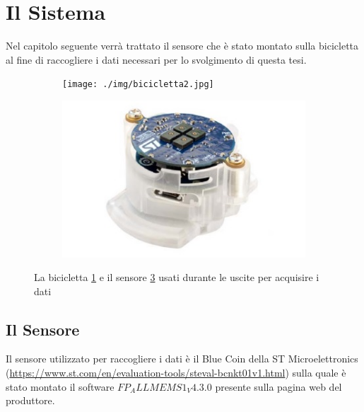 \documentclass[class=article]{standalone}
\begin{document}
	\section{Il Sistema}
	Nel capitolo seguente verrà trattato il sensore che è stato montato sulla bicicletta al fine di raccogliere i dati necessari per lo svolgimento di questa tesi. 
	
	\begin{figure}[h]
		\begin{subfigure}[h]{0.5\textwidth}
			\centering\texttt{[image: ./img/bicicletta2.jpg]}
			\caption{}
			\label{fig:bici}
		\end{subfigure}
		\begin{subfigure}[h]{0.5\textwidth}
			\centering\includegraphics[width=0.8\linewidth]{./img/bluecoin.jpg}
			\caption{}
			\label{fig:sensore}
		\end{subfigure}
		
		\caption[]{La bicicletta \ref{fig:bici} e il sensore \ref{fig:sensore} usati durante le uscite per acquisire i dati}
	\end{figure}
	
	\subsection{Il Sensore}
	Il sensore utilizzato per raccogliere i dati è il Blue Coin della ST Microelettronics (\url{https://www.st.com/en/evaluation-tools/steval-bcnkt01v1.html}) sulla quale è stato montato il software \(FP_ALLMEMS1_V4.3.0\) presente sulla pagina web del produttore.\hfill\break
	
\end{document}
